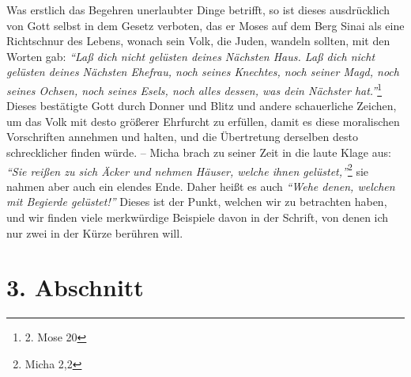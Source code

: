Was erstlich das Begehren unerlaubter Dinge betrifft, so ist dieses
ausdrücklich von Gott selbst in dem Gesetz verboten,
das er Moses auf dem
Berg Sinai als eine Richtschnur des Lebens, wonach
sein Volk, die Juden,
wandeln sollten, mit den Worten gab:
\textit{"`Laß dich nicht gelüsten deines Nächsten
Haus. Laß dich nicht gelüsten deines Nächsten Ehefrau, noch seines Knechtes,
noch seiner Magd, noch seines Ochsen, noch seines Esels, noch alles dessen, was
dein Nächster hat."'}\footnote{2. Mose 20}
Dieses bestätigte Gott durch Donner und
Blitz und andere schauerliche Zeichen, um das Volk
mit desto größerer Ehrfurcht
zu erfüllen, damit es diese moralischen Vorschriften annehmen und halten, und
die Übertretung derselben desto schrecklicher finden würde. --
Micha brach zu
seiner Zeit in die laute Klage aus:
\textit{"`Sie reißen zu sich Äcker und nehmen
Häuser, welche ihnen gelüstet,"'}\footnote{Micha 2,2}
sie nahmen aber auch ein
elendes Ende. Daher heißt es auch
\textit{"`Wehe denen, welchen mit Begierde gelüstet!"'}
Dieses ist der Punkt, welchen wir zu betrachten haben, und wir finden viele
merkwürdige Beispiele davon in der Schrift, von denen ich nur zwei in der Kürze
berühren will.

\section{3. Abschnitt} \label{kap13_ab3}

